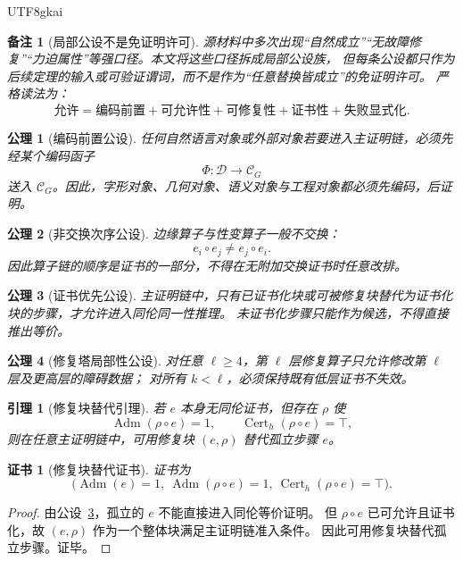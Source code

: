 \documentclass[12pt]{article}
\newtheorem{axiom}{公理}[section]
\newtheorem{lemma}{引理}[section]
\newtheorem{remark}{备注}[section]
\newtheorem{Certificate}{证书}[section]
\newcommand{\Cat}{\mathcal{C}}
\newcommand{\Adm}{\operatorname{Adm}}
\newcommand{\Cert}{\operatorname{Cert}}
\begin{document}
\begin{CJK*}{UTF8}{gkai}
\begin{remark}[局部公设不是免证明许可]
源材料中多次出现“自然成立”“无故障修复”“力迫属性”等强口径。本文将这些口径拆成局部公设族，
但每条公设都只作为后续定理的输入或可验证谓词，而不是作为“任意替换皆成立”的免证明许可。
严格读法为：
\[
  \text{允许}
  =
  \text{编码前置}
  +\text{可允许性}
  +\text{可修复性}
  +\text{证书性}
  +\text{失败显式化}.
\]
\end{remark}

\begin{axiom}[编码前置公设]
\label{ax:tex50-encoding-first}
任何自然语言对象或外部对象若要进入主证明链，必须先经某个编码函子
\[
  \Phi:\mathcal D\to\Cat_G
\]
送入 $\Cat_G$。因此，字形对象、几何对象、语义对象与工程对象都必须先编码，后证明。
\end{axiom}

\begin{axiom}[非交换次序公设]
\label{ax:tex50-noncomm}
边缘算子与性变算子一般不交换：
\[
  e_i\circ e_j\neq e_j\circ e_i.
\]
因此算子链的顺序是证书的一部分，不得在无附加交换证书时任意改排。
\end{axiom}

\begin{axiom}[证书优先公设]
\label{ax:tex50-certificate-first}
主证明链中，只有已证书化块或可被修复块替代为证书化块的步骤，才允许进入同伦同一性推理。
未证书化步骤只能作为候选，不得直接推出等价。
\end{axiom}

\begin{axiom}[修复塔局部性公设]
\label{ax:tex50-locality}
对任意 $\ell\ge4$，第 $\ell$ 层修复算子只允许修改第 $\ell$ 层及更高层的障碍数据；
对所有 $k<\ell$，必须保持既有低层证书不失效。
\end{axiom}

\begin{lemma}[修复块替代引理]
\label{lem:tex50-repair-block-replacement}
若 $e$ 本身无同伦证书，但存在 $\rho$ 使
\[
  \Adm(\rho\circ e)=1,
  \qquad
  \Cert_h(\rho\circ e)=\top,
\]
则在任意主证明链中，可用修复块 $(e,\rho)$ 替代孤立步骤 $e$。
\end{lemma}

\begin{Certificate}[修复块替代证书]
证书为
\[
  \bigl(\Adm(e)=1,\ \Adm(\rho\circ e)=1,\ \Cert_h(\rho\circ e)=\top\bigr).
\]
\end{Certificate}

\begin{proof}
由公设~\ref{ax:tex50-certificate-first}，孤立的 $e$ 不能直接进入同伦等价证明。
但 $\rho\circ e$ 已可允许且证书化，故 $(e,\rho)$ 作为一个整体块满足主证明链准入条件。
因此可用修复块替代孤立步骤。证毕。
\end{proof}


\end{CJK*}
\end{document}
